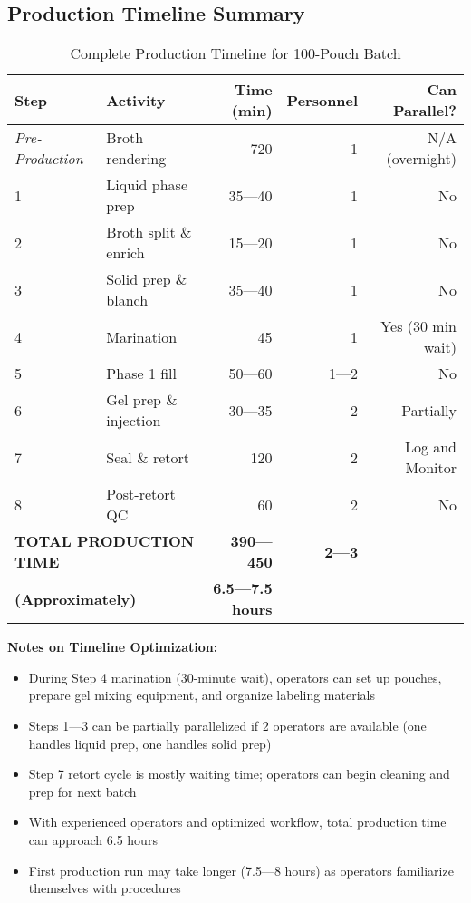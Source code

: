 {\begin{center}
\begin{tikzpicture}
\end{tikzpicture}
\end{center}


\clearpage
\subsection*{Production Timeline Summary}

\begin{table}[h]
\centering
\caption{Complete Production Timeline for 100-Pouch Batch}
\label{tab:timeline}
\begin{tabular}{@{}llrrr@{}}
\toprule
\textbf{Step} & \textbf{Activity} & \textbf{Time (min)} & \textbf{Personnel} & \textbf{Can Parallel?} \\
\midrule
\textit{Pre-Production} & Broth rendering & 720 & 1 & N/A (overnight) \\
\midrule
1 & Liquid phase prep & 35---40 & 1 & No \\
2 & Broth split \& enrich & 15---20 & 1 & No \\
3 & Solid prep \& blanch & 35---40 & 1 & No \\
4 & Marination & 45 & 1 & Yes (30 min wait) \\
5 & Phase 1 fill & 50---60 & 1---2 & No 
\\
6 & Gel prep \& injection & 30---35 & 2 & Partially \\
7 & Seal \& retort & 120 & 2 & Log and Monitor \\
8 & Post-retort QC & 60 & 2 & No \\
\midrule
\multicolumn{2}{l}{\textbf{TOTAL PRODUCTION TIME}} & \textbf{390---450} & \textbf{2---3} & \\
\multicolumn{2}{l}{\textbf{(Approximately)}} & \textbf{6.5---7.5 hours} & & \\
\bottomrule
\end{tabular}
\end{table}

\vspace{1em}
\noindent\textbf{Notes on Timeline Optimization:}
\begin{itemize}
\item During Step 4 marination (30-minute wait), operators can set up pouches, prepare gel mixing equipment, and organize labeling materials
\item Steps 1---3 can be partially parallelized if 2 operators are available (one handles liquid prep, one handles solid prep)
\item Step 7 retort cycle is mostly waiting time;
operators can begin cleaning and prep for next batch
\item With experienced operators and optimized workflow, total production time can approach 6.5 hours
\item First production run may take longer (7.5---8 hours) as operators familiarize themselves with procedures
\end{itemize}

}

